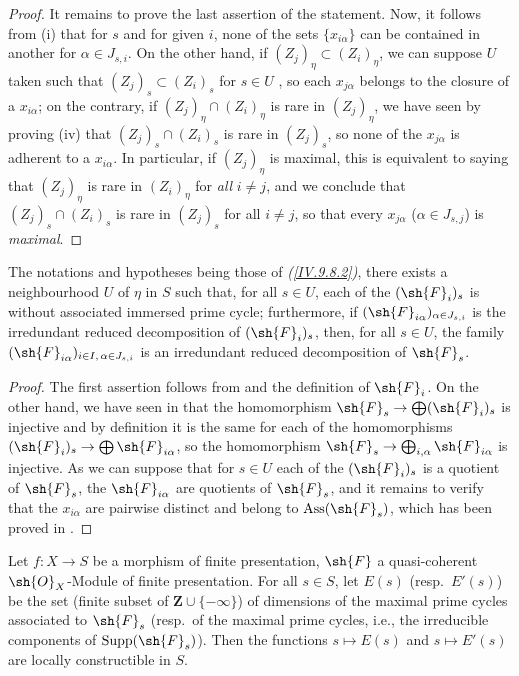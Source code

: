 \begin{proof}
It remains to prove the last assertion of the statement.
Now, it follows from (i) that for $s$ and for given $i$, none of the sets $\{x_{i\alpha}\}$ can be contained in another for $\alpha\in J_{s,i}$.
On the other hand, if $(Z_j)_\eta\subset(Z_i)_\eta$, we can suppose $U$ taken such that $(Z_j)_s\subset(Z_i)_s$ for $s\in U$ , so each $x_{j\alpha}$ belongs to the closure of a $x_{i\alpha}$; on the contrary, if $(Z_j)_\eta\cap(Z_i)_\eta$ is rare in $(Z_j)_\eta$, we have seen by proving (iv) that $(Z_j)_s\cap(Z_i)_s$ is rare in $(Z_j)_s$, so none of the $x_{j\alpha}$ is adherent to a $x_{i\alpha}$.
In particular, if $(Z_j)_\eta$ is maximal, this is equivalent to saying that $(Z_j)_\eta$ is rare in $(Z_i)_\eta$ for \emph{all} $i\neq j$, and we conclude that $(Z_j)_s\cap(Z_i)_s$ is rare in $(Z_j)_s$ for all $i\neq j$, so that every $x_{j\alpha}$ ($\alpha\in J_{s,j}$) is \emph{maximal}.
\end{proof}

\begin{corollary}[9.8.4]
\label{IV.9.8.4}
The notations and hypotheses being those of \emph{(\ref{IV.9.8.2})}, there exists a neighbourhood $U$ of $\eta$ in $S$ such that, for all $s\in U$, each of the $(\sh{F}_i)_s$ is without associated immersed prime cycle; furthermore, if $(\sh{F}_{i\alpha})_{\alpha\in J_{s,i}}$ is the irredundant reduced decomposition of $(\sh{F}_i)_s$, then, for all $s\in U$, the family $(\sh{F}_{i\alpha})_{i\in I,\,\alpha\in J_{s,i}}$ is an irredundant reduced decomposition of $\sh{F}_s$.
\end{corollary}

\begin{proof}
\label{IV.9.8.4-proof}
The first assertion follows from  and the definition of $\sh{F}_i$.
On the other hand, we have seen in  that the homomorphism $\sh{F}_s\to\bigoplus(\sh{F}_i)_s$ is injective and by definition it is the same for each of the homomorphisms $(\sh{F}_i)_s\to\bigoplus\sh{F}_{i\alpha}$, so the homomorphism $\sh{F}_s\to\bigoplus_{i,\alpha}\sh{F}_{i\alpha}$ is injective.
As we can suppose  that for $s\in U$ each of the $(\sh{F}_i)_s$ is a quotient of $\sh{F}_s$, the $\sh{F}_{i\alpha}$ are quotients of $\sh{F}_s$, and it remains to verify  that the $x_{i\alpha}$ are pairwise distinct and belong to $\operatorname{Ass}(\sh{F}_s)$, which has been proved in .
\end{proof}

\begin{proposition}[9.8.5]
\label{IV.9.8.5}
Let $f:X\to S$ be a morphism of finite presentation, $\sh{F}$ a quasi-coherent $\sh{O}_X$-Module of finite presentation.
For all $s\in S$, let $E(s)$ (resp.~$E'(s)$) be the set (finite subset of $\mathbf{Z}\cup\{-\infty\}$) of dimensions of the maximal prime cycles associated to $\sh{F}_s$ (resp.~of the maximal prime cycles, i.e., the irreducible components of $\operatorname{Supp}(\sh{F}_s)$).
Then the functions $s\mapsto E(s)$ and $s\mapsto E'(s)$ are locally constructible in $S$.
\end{proposition}

